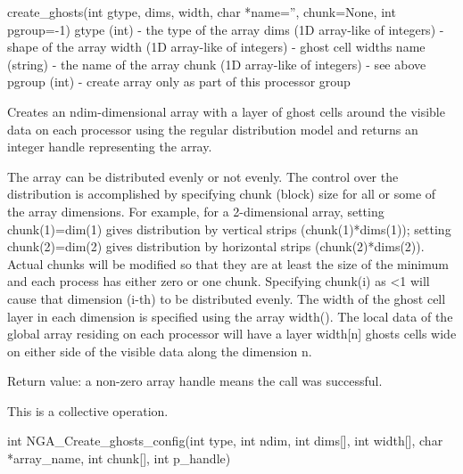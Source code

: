 \documentclass[12pt]{article}
\begin{document}
\begin{pyapi}
\begin{pycode}
create_ghosts(int gtype, dims, width, char *name='', chunk=None, int pgroup=-1)
   gtype (int)                       - the type of the array
   dims (1D array-like of integers)  - shape of the array
   width (1D array-like of integers) - ghost cell widths
   name (string)                     - the name of the array
   chunk (1D array-like of integers) - see above
   pgroup (int)                      - create array only as part of this
                                       processor group
\end{pycode}
\end{pyapi}

\dcoll

\begin{desc}

  Creates an ndim-dimensional array with a layer of ghost cells around
  the visible data on each processor using the regular distribution
  model and returns an integer handle representing the array.

  The array can be distributed evenly or not evenly. The control over
  the distribution is accomplished by specifying chunk (block) size
  for all or some of the array dimensions. For example, for a
  2-dimensional array, setting chunk(1)=dim(1) gives distribution by
  vertical strips (chunk(1)*dims(1)); setting chunk(2)=dim(2) gives
  distribution by horizontal strips (chunk(2)*dims(2)). Actual chunks
  will be modified so that they are at least the size of the minimum
  and each process has either zero or one chunk. Specifying chunk(i)
  as \textless 1 will cause that dimension (i-th) to be distributed evenly. The
  width of the ghost cell layer in each dimension is specified using
  the array width(). The local data of the global array residing on
  each processor will have a layer width[n] ghosts cells wide on
  either side of the visible data along the dimension n.

  Return value: a non-zero array handle means the call was successful.

  This is a collective operation.
\end{desc}



\begin{capi}
\begin{ccode}
int NGA_Create_ghosts_config(int type, int ndim, int dims[],
                             int width[], char *array_name, int chunk[],
                             int p_handle)
\end{ccode}
\begin{funcargs}
\end{funcargs}
\end{capi}
\end{document}
